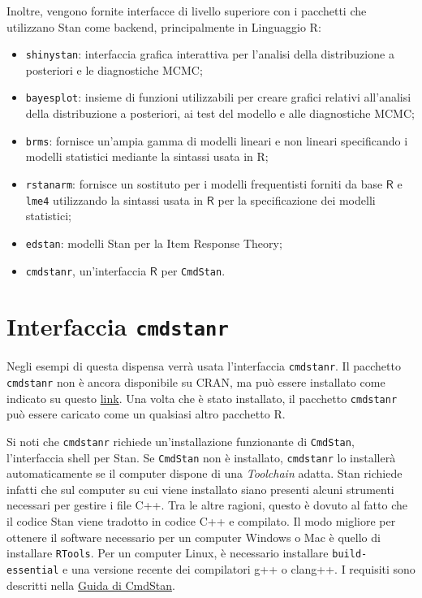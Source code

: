 \documentclass[
  10pt,
  italian,
  a4paper,
  extrafontsizes,onecolumn,openright
  ]{memoir}
\providecommand{\tightlist}{%
  \setlength{\itemsep}{0pt}\setlength{\parskip}{0pt}}
\newlength{\rf}
\newcommand{\R}{\textsf{R}} %
\begin{document}
Inoltre, vengono fornite interfacce di livello superiore con i pacchetti che utilizzano Stan come backend, principalmente in Linguaggio \R:

\begin{itemize}
\tightlist
\item
  \texttt{shinystan}: interfaccia grafica interattiva per l'analisi della distribuzione a posteriori e le diagnostiche MCMC;\\
\item
  \texttt{bayesplot}: insieme di funzioni utilizzabili per creare grafici relativi all'analisi della distribuzione a posteriori, ai test del modello e alle diagnostiche MCMC;\\
\item
  \texttt{brms}: fornisce un'ampia gamma di modelli lineari e non lineari specificando i modelli statistici mediante la sintassi usata in \R;
\item
  \texttt{rstanarm}: fornisce un sostituto per i modelli frequentisti forniti da base \(\R\) e \texttt{lme4} utilizzando la sintassi usata in \(\R\) per la specificazione dei modelli statistici;
\item
  \texttt{edstan}: modelli Stan per la Item Response Theory;
\item
  \texttt{cmdstanr}, un'interfaccia \(\R\) per \texttt{CmdStan}.
\end{itemize}

\hypertarget{interfaccia-cmdstanr}{%
\section{\texorpdfstring{Interfaccia \texttt{cmdstanr}}{Interfaccia cmdstanr}}\label{interfaccia-cmdstanr}}

Negli esempi di questa dispensa verrà usata l'interfaccia \texttt{cmdstanr}. Il pacchetto \texttt{cmdstanr} non è ancora disponibile su CRAN, ma può essere installato come indicato su questo \href{https://mc-stan.org/docs/2_27/cmdstan-guide/cmdstan-installation.html}{link}. Una volta che è stato installato, il pacchetto \texttt{cmdstanr} può essere caricato come un qualsiasi altro pacchetto R.

Si noti che \texttt{cmdstanr} richiede un'installazione funzionante di \texttt{CmdStan}, l'interfaccia shell per Stan. Se \texttt{CmdStan} non è installato, \texttt{cmdstanr} lo installerà automaticamente se il computer dispone di una \emph{Toolchain} adatta. Stan richiede infatti che sul computer su cui viene installato siano presenti alcuni strumenti necessari per gestire i file C++. Tra le altre ragioni, questo è dovuto al fatto che il codice Stan viene tradotto in codice C++ e compilato. Il modo migliore per ottenere il software necessario per un computer Windows o Mac è quello di installare \texttt{RTools}. Per un computer Linux, è necessario installare \texttt{build-essential} e una versione recente dei compilatori g++ o clang++. I requisiti sono descritti nella \href{https://mc-stan.org/docs/cmdstan-guide/cmdstan-installation.html}{Guida di CmdStan}.
\end{document}
